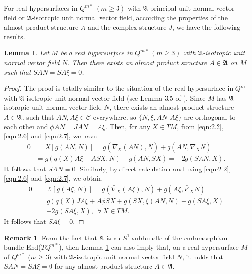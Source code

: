 \documentclass[reqno]{amsart}%
\newtheorem{lemma}[theorem]{Lemma}
\theoremstyle{definition}
\newtheorem{remark}{Remark}[section]
\numberwithin{equation}{section}
\begin{document}

For real hypersurfaces in $Q^{m*}\ (m\ge3)$ with $\mathfrak{A}$-principal unit normal vector field or $\mathfrak{A}$-isotropic unit normal vector field, according the properties of the almost product structure $A$ and the complex structure $J$, we have the following results.



\begin{lemma}\label{lemma:2.6}
Let $M$ be a real hypersurface in $Q^{m*}\ (m\ge3)$ with $\mathfrak{A}$-isotropic
unit normal vector field $N$. Then there exists an almost product structure $A\in\mathfrak{A}$
on $M$ such that $SAN=SA\xi=0$.
\end{lemma}
\begin{proof}
The proof is totally similar to the situation of the real hypersurface in $Q^m$ with $\mathfrak{A}$-isotropic unit normal vector field (see Lemma 3.5 of \cite{Loo11}).
Since $M$ has $\mathfrak{A}$-isotropic unit normal vector field $N$, there exists
an almost product structure $A\in \mathfrak{A}$, such that $AN,A\xi\in \mathcal{C}$ everywhere,
so $\{N, \xi, AN, A\xi\}$ are
orthogonal to each other and $\phi AN=JAN=A\xi$. Then, for any $X\in TM$, from \eqref{eqn:2.2}, \eqref{eqn:2.6} and \eqref{eqn:2.7}, we have
%
$$
\begin{aligned}
0&=X[g(AN,N)]=g(\bar{\nabla}_X(AN),N)+g(AN,\bar{\nabla}_XN)\\
&=g(q(X)A\xi-ASX,N)-g(AN,SX)=-2g(SAN,X).
\end{aligned}
$$
It follows that $SAN=0$. %
Similarly, by direct calculation and using \eqref{eqn:2.2}, \eqref{eqn:2.6} and \eqref{eqn:2.7},
we obtain
%
$$
\begin{aligned}
0&=X[g(A\xi,N)]=g(\bar{\nabla}_X(A\xi),N)+g(A\xi,\bar{\nabla}_XN)\\
&=g(q(X)JA\xi+A\phi SX+g(SX,\xi)AN,N)-g(SA\xi,X)\\
&=-2g(SA\xi,X),\ \ \forall\, X\in TM.
\end{aligned}
$$
It follows that $SA\xi=0$.
\end{proof}

\begin{remark}\label{rem:2.2aaas}
From the fact that $\mathfrak{A}$ is an $S^1$-subbundle of the endomorphism
bundle End($TQ^{m*}$), then Lemma \ref{lemma:2.6} can also imply that, on a
real hypersurface $M$ of $Q^{m*}$ ($m\geq3$) with $\mathfrak{A}$-isotropic unit normal vector field $N$,
it holds that $SAN=SA\xi=0$ for any almost product structure $A\in\mathfrak{A}$.
\end{remark}
\end{document}
